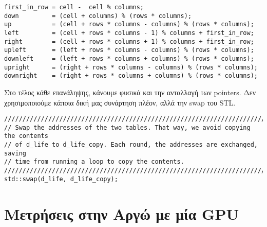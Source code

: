 \begin{tcolorbox}
\begin{verbatim}
first_in_row = cell -  cell % columns;
down         = (cell + columns) % (rows * columns);
up           = (cell + rows * columns - columns) % (rows * columns);
left         = (cell + rows * columns - 1) % columns + first_in_row;
right        = (cell + rows * columns + 1) % columns + first_in_row;
upleft       = (left + rows * columns - columns) % (rows * columns);
downleft     = (left + rows * columns + columns) % (rows * columns);
upright      = (right + rows * columns - columns) % (rows * columns);
downright    = (right + rows * columns + columns) % (rows * columns);
\end{verbatim}
\end{tcolorbox}

Στο τέλος κάθε επανάληψης, κάνουμε φυσικά και την ανταλλαγή των pointers. Δεν χρησιμοποιούμε κάποια δική μας συνάρτηση πλέον, αλλά την swap του STL.

\begin{tcolorbox}
\begin{verbatim}
///////////////////////////////////////////////////////////////////////////////
// Swap the addresses of the two tables. That way, we avoid copying the contents
// of d_life to d_life_copy. Each round, the addresses are exchanged, saving
// time from running a loop to copy the contents.
///////////////////////////////////////////////////////////////////////////////
std::swap(d_life, d_life_copy);
\end{verbatim}
\end{tcolorbox}

\section{Μετρήσεις στην Αργώ με μία GPU}


